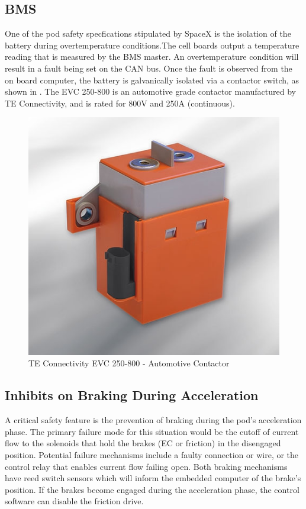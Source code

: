 \documentclass[main.tex]{subfiles}
\begin{document}
    \subsection{BMS}
    One of the pod safety specfications stipulated by SpaceX is the isolation of the battery during overtemperature conditions.The cell boards output a temperature reading that is measured by the BMS master. An overtemperature condition will result in a fault being set on the CAN bus. Once the fault is observed from the on board computer, the battery is galvanically isolated via a contactor switch, as shown in . The EVC 250-800 is an automotive grade contactor manufactured by TE Connectivity, and is rated for 800V and 250A (continuous).
    \begin{figure}[H]
        \centering
        \includegraphics[scale = 0.5]{images/contactor}
        \caption{TE Connectivity EVC 250-800 - Automotive Contactor }
        \label{fig:contactor}
    \end{figure}

    \subsection{Inhibits on Braking During Acceleration}
    A critical safety feature is the prevention of braking during the pod's acceleration phase. The primary failure mode for this situation would be the cutoff of current flow to the solenoids that hold the brakes (EC or friction) in the disengaged position. Potential failure mechanisms include a faulty connection or wire, or the control relay that enables current flow failing open. Both braking mechanisms have reed switch sensors which will inform the embedded computer of the brake's position. If the brakes become engaged during the acceleration phase, the control software can disable the friction drive.
\end{document}
